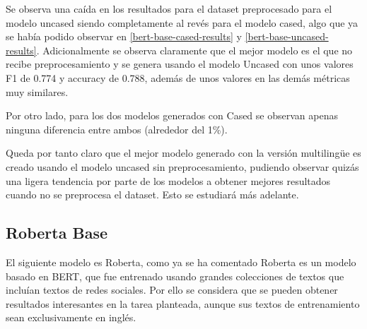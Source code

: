 Se observa una caída en los resultados para el dataset preprocesado para el modelo uncased siendo completamente al revés para el modelo cased, algo que ya se había podido observar en \autoref{bert-base-cased-results} y \autoref{bert-base-uncased-results}. Adicionalmente se observa claramente que el mejor modelo es el que no recibe preprocesamiento y se genera usando el modelo Uncased con unos valores F1 de 0.774 y accuracy de 0.788, además de unos valores en las demás métricas muy similares.

Por otro lado, para los dos modelos generados con Cased se observan apenas ninguna diferencia entre ambos (alrededor del 1\%). 

Queda por tanto claro que el mejor modelo generado con la versión multilingüe es creado usando el modelo uncased sin preprocesamiento, pudiendo observar quizás una ligera tendencia por parte de los modelos a obtener mejores resultados cuando no se preprocesa el dataset. Esto se estudiará más adelante.


\subsection{Roberta Base}
El siguiente modelo es Roberta, como ya se ha comentado Roberta es un modelo basado en BERT, que fue entrenado usando grandes colecciones de textos que incluían textos de redes sociales. Por ello se considera que se pueden obtener resultados interesantes en la tarea planteada, aunque sus textos de entrenamiento sean exclusivamente en inglés.

